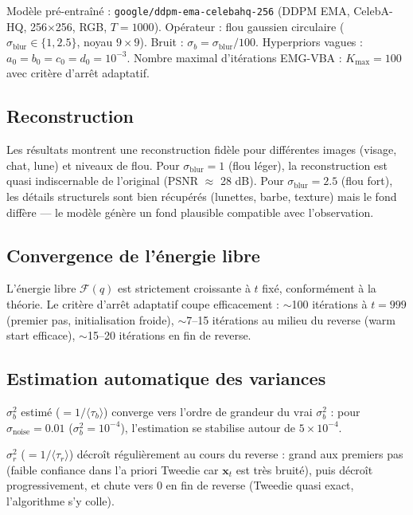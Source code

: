 \documentclass[12pt]{article}
\newcommand{\x}{\boldsymbol{x}}
\begin{document}
Modèle pré-entraîné : \texttt{google/ddpm-ema-celebahq-256} (DDPM EMA, CelebA-HQ, 256$\times$256, RGB, $T = 1000$). Opérateur : flou gaussien circulaire ($\sigma_{\text{blur}} \in \{1, 2.5\}$, noyau $9\times 9$). Bruit : $\sigma_b = \sigma_{\text{blur}} / 100$. Hyperpriors vagues : $a_0 = b_0 = c_0 = d_0 = 10^{-3}$. Nombre maximal d'itérations EMG-VBA : $K_{\max} = 100$ avec critère d'arrêt adaptatif.

\subsection{Reconstruction}

Les résultats montrent une reconstruction fidèle pour différentes images (visage, chat, lune) et niveaux de flou. Pour $\sigma_{\text{blur}} = 1$ (flou léger), la reconstruction est quasi indiscernable de l'original (PSNR $\approx$ 28 dB). Pour $\sigma_{\text{blur}} = 2.5$ (flou fort), les détails structurels sont bien récupérés (lunettes, barbe, texture) mais le fond diffère --- le modèle génère un fond plausible compatible avec l'observation.


\subsection{Convergence de l'énergie libre}

L'énergie libre $\mathcal{F}(q)$ est strictement croissante à $t$ fixé, conformément à la théorie. Le critère d'arrêt adaptatif coupe efficacement : $\sim$100 itérations à $t = 999$ (premier pas, initialisation froide), $\sim$7--15 itérations au milieu du reverse (warm start efficace), $\sim$15--20 itérations en fin de reverse.

\subsection{Estimation automatique des variances}

$\sigma_b^2$ estimé ($= 1/\langle\tau_b\rangle$) converge vers l'ordre de grandeur du vrai $\sigma_b^2$ : pour $\sigma_{\text{noise}} = 0.01$ ($\sigma_b^2 = 10^{-4}$), l'estimation se stabilise autour de $5 \times 10^{-4}$.

$\sigma_r^2$ ($= 1/\langle\tau_r\rangle$) décroît régulièrement au cours du reverse : grand aux premiers pas (faible confiance dans l'a priori Tweedie car $\x_t$ est très bruité), puis décroît progressivement, et chute vers 0 en fin de reverse (Tweedie quasi exact, l'algorithme s'y colle).
\end{document}
